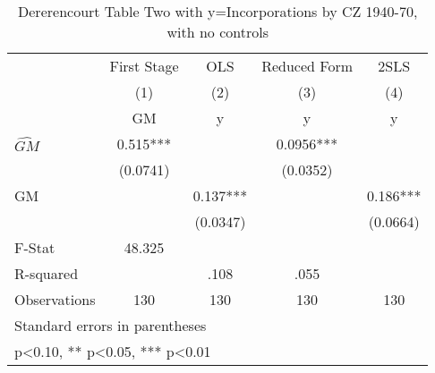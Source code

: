 \begin{table}[htbp]\centering
\def\sym#1{\ifmmode^{#1}\else\(^{#1}\)\fi}
\caption{Dererencourt Table Two with y=Incorporations by CZ 1940-70, with no controls}
\begin{tabular}{l*{4}{c}}
\toprule
                    & First Stage   &         OLS   &Reduced Form   &        2SLS   \\
                    &\multicolumn{1}{c}{(1)}&\multicolumn{1}{c}{(2)}&\multicolumn{1}{c}{(3)}&\multicolumn{1}{c}{(4)}\\
                    &\multicolumn{1}{c}{GM}&\multicolumn{1}{c}{y}&\multicolumn{1}{c}{y}&\multicolumn{1}{c}{y}\\
\midrule
$\hat{GM}$          &       0.515***&               &      0.0956***&               \\
                    &    (0.0741)   &               &    (0.0352)   &               \\
\addlinespace
GM                  &               &       0.137***&               &       0.186***\\
                    &               &    (0.0347)   &               &    (0.0664)   \\
\midrule
F-Stat              &      48.325   &               &               &               \\
R-squared           &               &        .108   &        .055   &               \\
Observations        &         130   &         130   &         130   &         130   \\
\bottomrule
\multicolumn{5}{l}{\footnotesize Standard errors in parentheses}\\
\multicolumn{5}{l}{\footnotesize * p<0.10, ** p<0.05, *** p<0.01}\\
\end{tabular}
\end{table}
